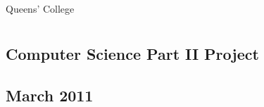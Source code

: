 \thispagestyle{empty}

\begin{flushright}
    \myName
    
    Queens' College
\end{flushright}

\bigskip

\begingroup
    \thispagestyle{empty}
    \let\clearpage\relax
    \let\cleardoublepage\relax
    \let\cleardoublepage\relax
    \thispagestyle{empty}
    \chapter*{\myTitle }
    
    \section*{Computer Science Part II Project}
    
    \section*{March 2011}
    \thispagestyle{empty}
\endgroup